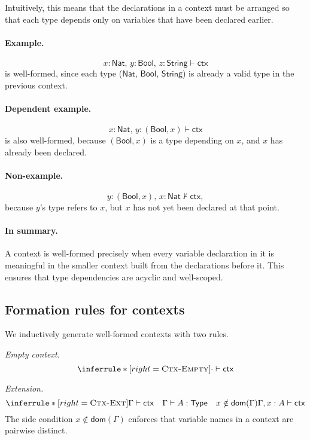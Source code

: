 \documentclass{article}
\newcommand{\Type}{\mathsf{Type}}
\newcommand{\Nat}{\mathsf{Nat}}
\newcommand{\Bool}{\mathsf{Bool}}
\newcommand{\String}{\mathsf{String}}
\newcommand{\emptyctx}{\cdot}              %
\newcommand{\ctx}{\mathsf{ctx}}            %
\newcommand{\judg}[3]{#1 \vdash #2 : #3}   %
\newcommand{\dom}{\mathsf{dom}}            %
\newcommand{\rulename}[1]{\textsc{#1}}
\begin{document}
Intuitively, this means that the declarations in a context must be arranged so
that each type depends only on variables that have been declared earlier.

\paragraph{Example.}
\[
x:\Nat,\, y:\Bool,\, z:\String \vdash \ctx
\]
is well-formed, since each type (\(\Nat\), \(\Bool\), \(\String\)) is already a valid
type in the previous context.

\paragraph{Dependent example.}
\[
x:\Nat,\, y: (\Bool, x) \vdash \ctx
\]
is also well-formed, because
\((\Bool, x)\) is a type depending on \(x\), and \(x\) has already been declared.

\paragraph{Non-example.}
\[
y:(\Bool, x),\, x:\Nat \not\vdash \ctx,
\]
because \(y\)’s type refers to \(x\), but \(x\) has not yet been declared at that point.

\paragraph{In summary.}
A context is well-formed precisely when every variable declaration in it is
meaningful in the smaller context built from the declarations before it.  
This ensures that type dependencies are acyclic and well-scoped.

\subsection*{Formation rules for contexts}

We inductively generate well-formed contexts with two rules.

\medskip
\noindent
\emph{Empty context.}
\[
\inferrule*[right=\rulename{Ctx-Empty}]{
}{
\emptyctx \vdash \ctx
}
\]

\medskip
\noindent
\emph{Extension.}
\[
\inferrule*[right=\rulename{Ctx-Ext}]{
\Gamma \vdash \ctx
\quad
\judg{\Gamma}{A}{\Type}
\quad
x \notin \dom(\Gamma)
}{
\Gamma, x:A \vdash \ctx
}
\]
The side condition \(x \notin \dom(\Gamma)\) enforces that variable names in a
context are pairwise distinct.
\end{document}
